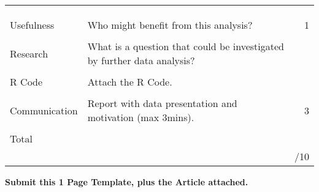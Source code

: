\documentclass[bigtut]{quiz}\usepackage[]{graphicx}\usepackage[]{color}
\begin{document}
\begin{tutorial}
\begin{tabular}{|l|l|r|}
& & \\ 
& & \\
& & \\ \hline
Usefulness & {\tiny Who might benefit from this analysis?} & 1 \\
& & \\
Research & {\tiny What is a question that could be investigated by further data analysis?} &  \\
& & \\
R Code & {\tiny Attach the R Code.} &  \\ 
& & \\ \hline
Communication & {\tiny Report with data presentation and motivation  (max 3mins).} & 3 \\ 
& & \\ \hline
Total & &  \\ 
& & /10 \\ \hline
\end{tabular}

\newpage
{}  {\tiny \bf  Submit this 1 Page Template, plus the Article attached.}


\end{tutorial}
\end{document}
